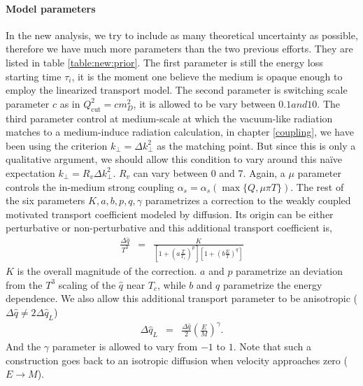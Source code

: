 \paragraph{Model parameters}
In the new analysis, we try to include as many theoretical uncertainty as possible, therefore we have much more parameters than the two previous efforts.
They are listed in table \ref{table:new:prior}.
The first parameter is still the energy loss starting time $\tau_i$, it is the moment one believe the medium is opaque enough to employ the linearized transport model.
The second parameter is switching scale parameter $c$ as in $Q_{\textrm{cut}}^2 = c m_D^2$, it is allowed to be vary between $0.1 and 10$.
The third parameter control at medium-scale at which the vacuum-like radiation matches to a medium-induce radiation calculation, in chapter \ref{coupling}, we have been using the criterion $k_\perp = \Delta k_\perp^2$ as the matching point.
But since this is only a qualitative argument, we should allow this condition to vary around this na\"ive expectation $k_\perp = R_v \Delta k_\perp^2$.
$R_v$ can vary between 0 and 7.
Again, a $\mu$ parameter controls the in-medium strong coupling $\alpha_s = \alpha_s(\max\{Q, \mu\pi T\})$.
The rest of the six parameters $K,a,b,p,q, \gamma$ parametrizes a correction to the weakly coupled motivated transport coefficient modeled by diffusion. 
Its origin can be either perturbative or non-perturbative and this additional transport coefficient is,
\begin{eqnarray}
\frac{\Delta\hat{q}}{T^3} &=& \frac{K}{\left[1+\left(a\frac{T}{T_c}\right)^p\right]\left[1+\left(b\frac{E}{T}\right)^q\right]}
\end{eqnarray}
$K$ is the overall magnitude of the correction. $a$ and $p$ parametrize an deviation from the $T^3$ scaling of the $\hat{q}$ near $T_c$, while $b$ and $q$ parametrize the energy dependence.
We also allow this additional transport parameter to be anisotropic ($\Delta\hat{q}\neq 2\Delta\hat{q}_L$)
\begin{eqnarray}
\Delta\hat{q}_L &=& \frac{\Delta\hat{q}}{2} \left(\frac{E}{M}\right)^{\gamma}.
\end{eqnarray}
And the $\gamma$ parameter is allowed to vary from $-1$ to $1$.
Note that such a construction goes back to an isotropic diffusion when velocity approaches zero ($E\rightarrow M$).

